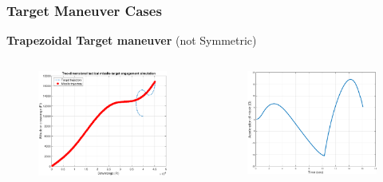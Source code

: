 \documentclass{beamer}
\begin{document}
\begin{frame}
\frametitle{Target Maneuver Cases}
\textbf{Trapezoidal Target maneuver} (not Symmetric)
\begin{columns}[c]
	\begin{column}{.3\linewidth}
		\begin{figure}
			\centering
			\includegraphics[scale = 0.18]{fig/trajectoryTrap.pdf}
		\end{figure}
	\end{column}
	
	\begin{column}{.3\linewidth}
		\begin{figure}
			\centering
			\includegraphics[scale = 0.18]{fig/MissileAccelerationTrap.pdf}
		\end{figure}
	\end{column}
	

\end{columns}
\end{frame}
\end{document}
